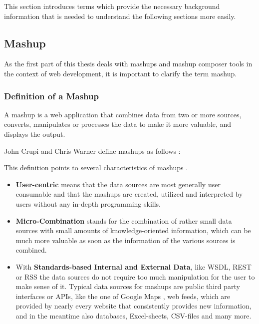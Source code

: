 This section introduces terms which provide the necessary background
information that is needed to understand the following sections more easily.

\subsection{Mashup}
\label{sec:mashup}
As the first part of this thesis deals with mashups and mashup composer tools in the context of web
development, it is important to clarify the term mashup.

\subsubsection{Definition of a Mashup}
A mashup is a web application that combines data from two or more sources,
converts, manipulates or processes the data to make it more valuable, and
displays the output.

John Crupi and Chris Warner define mashups as follows \cite{mashup_definition}:


\par This definition points to several characteristics of mashups \cite{mashup_definition}.

\begin{itemize}
	\item \textbf{User-centric} means that the data sources are most generally user
	consumable and that the mashups are created, utilized and interpreted by users without any
	in-depth programming skills.
	\item \textbf{Micro-Combination} stands for the combination of rather small
	data sources with small amounts of knowledge-oriented information, which can
	be much more valuable as soon as the information of the various sources is
	combined.
	\item With \textbf{Standards-based Internal and External Data}, like WSDL, REST or RSS the
	data sources do not require too much manipulation for the user to make sense of it. Typical data sources
	for mashups are public third party interfaces or APIs, like the one of Google Maps
	\cite{google_maps}, web feeds, which are provided by nearly every website that consistently
	provides new information, and in the meantime also databases, Excel-sheets, CSV-files and many
	more.
\end{itemize}

